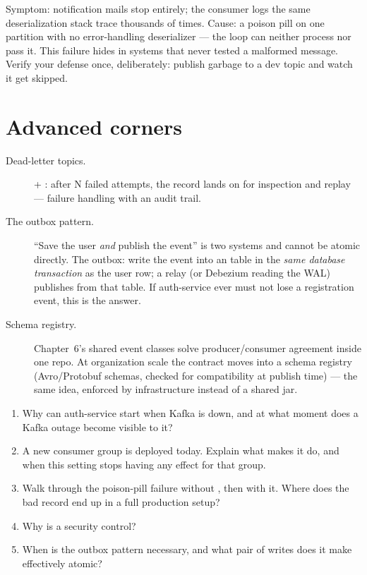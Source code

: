 \begin{pitfall}
Symptom: notification mails stop entirely; the consumer logs the same
deserialization stack trace thousands of times. Cause: a poison pill on
one partition with no error-handling deserializer --- the loop can
neither process nor pass it. This failure hides in systems that never
tested a malformed message. Verify your defense once, deliberately:
publish garbage to a dev topic and watch it get skipped.
\end{pitfall}

\section{Advanced corners}

\begin{description}
  \item[Dead-letter topics.]  +
  : after N failed attempts,
  the record lands on  for inspection and replay ---
  failure handling with an audit trail.
  \item[The outbox pattern.] ``Save the user \emph{and} publish the
  event'' is two systems and cannot be atomic directly. The outbox:
  write the event into an  table in the \emph{same database
  transaction} as the user row; a relay (or Debezium reading the WAL)
  publishes from that table. If auth-service ever must not lose a
  registration event, this is the answer.
  \item[Schema registry.] Chapter~6's shared event classes solve
  producer/consumer agreement inside one repo. At organization scale the
  contract moves into a schema registry (Avro/Protobuf schemas, checked
  for compatibility at publish time) --- the same idea, enforced by
  infrastructure instead of a shared jar.
\end{description}

\begin{quiz}
\begin{enumerate}
  \item Why can auth-service start when Kafka is down, and at what
  moment does a Kafka outage become visible to it?
  \item A new consumer group is deployed today. Explain what
   makes it do, and when this setting
  stops having any effect for that group.
  \item Walk through the poison-pill failure without
  , then with it. Where does the bad
  record end up in a full production setup?
  \item Why is  a security control?
  \item When is the outbox pattern necessary, and what pair of writes
  does it make effectively atomic?
\end{enumerate}
\end{quiz}
